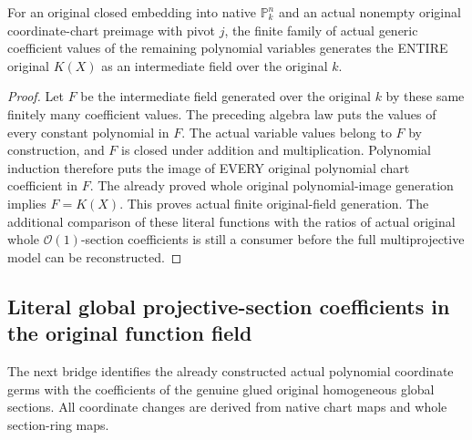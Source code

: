 \begin{theorem}
\label{thm:seven-original-finite-projective-field-generation-route}
\leanok
{}
For an original closed embedding into native $\mathbb P^n_k$ and an
actual nonempty original coordinate-chart preimage with pivot $j$,
the finite family of actual generic coefficient values of the
remaining polynomial variables generates the ENTIRE original
$K(X)$ as an intermediate field over the original $k$.
\end{theorem}
\begin{proof}
Let $F$ be the intermediate field generated over the original $k$ by
these same finitely many coefficient values. The preceding algebra
law puts the values of every constant polynomial in $F$. The actual
variable values belong to $F$ by construction, and $F$ is closed under
addition and multiplication. Polynomial induction therefore puts the
image of EVERY original polynomial chart coefficient in $F$.
The already proved whole original polynomial-image generation implies
$F=K(X)$. This proves actual finite original-field generation. The
additional comparison of these literal functions with the ratios of
actual original whole $\mathcal O(1)$-section coefficients is still a
consumer before the full multiprojective model can be reconstructed.
\end{proof}
\subsection{Literal global projective-section coefficients in the original function field}
The next bridge identifies the already constructed actual polynomial
coordinate germs with the coefficients of the genuine glued original
homogeneous global sections. All coordinate changes are derived from
native chart maps and whole section-ring maps.

